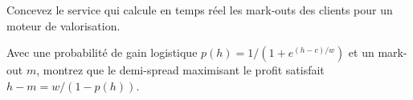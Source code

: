 \begin{interviewq}\label{iq:s2:flow-market-making-at-a-bank:5}
Concevez le service qui calcule en temps réel les mark-outs des clients pour un moteur de valorisation.
\end{interviewq}

\begin{interviewq}\label{iq:s2:flow-market-making-at-a-bank:6}
Avec une probabilité de gain logistique $p(h) = 1/(1 + e^{(h - c)/w})$ et un mark-out $m$, montrez que le demi-spread maximisant le profit satisfait
$h - m = w / (1 - p(h))$.
\end{interviewq}
